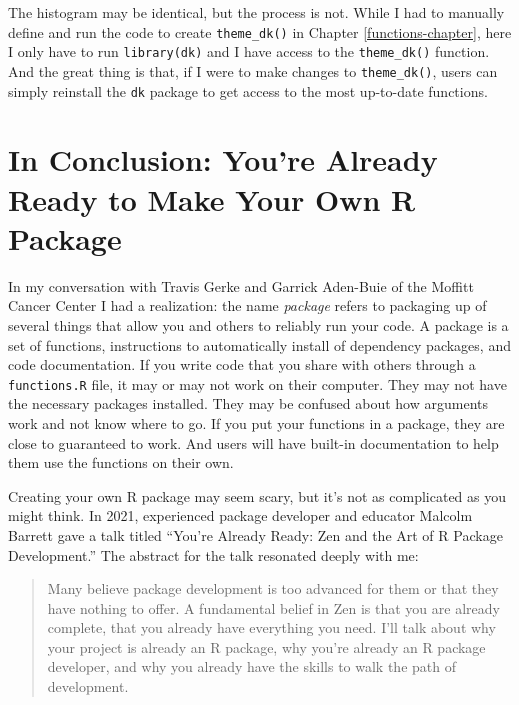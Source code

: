 \documentclass[
]{book}
\begin{document}
The histogram may be identical, but the process is not. While I had to manually define and run the code to create \texttt{theme\_dk()} in Chapter \ref{functions-chapter}, here I only have to run \texttt{library(dk)} and I have access to the \texttt{theme\_dk()} function. And the great thing is that, if I were to make changes to \texttt{theme\_dk()}, users can simply reinstall the \texttt{dk} package to get access to the most up-to-date functions.

\hypertarget{in-conclusion-youre-already-ready-to-make-your-own-r-package}{%
\section*{In Conclusion: You're Already Ready to Make Your Own R Package}\label{in-conclusion-youre-already-ready-to-make-your-own-r-package}}

In my conversation with Travis Gerke and Garrick Aden-Buie of the Moffitt Cancer Center I had a realization: the name \emph{package} refers to packaging up of several things that allow you and others to reliably run your code. A package is a set of functions, instructions to automatically install of dependency packages, and code documentation. If you write code that you share with others through a \texttt{functions.R} file, it may or may not work on their computer. They may not have the necessary packages installed. They may be confused about how arguments work and not know where to go. If you put your functions in a package, they are close to guaranteed to work. And users will have built-in documentation to help them use the functions on their own.

Creating your own R package may seem scary, but it's not as complicated as you might think. In 2021, experienced package developer and educator Malcolm Barrett gave a talk titled ``You're Already Ready: Zen and the Art of R Package Development.'' The abstract for the talk resonated deeply with me:

\begin{quote}
Many believe package development is too advanced for them or that they have nothing to offer. A fundamental belief in Zen is that you are already complete, that you already have everything you need. I'll talk about why your project is already an R package, why you're already an R package developer, and why you already have the skills to walk the path of development.
\end{quote}
\end{document}
